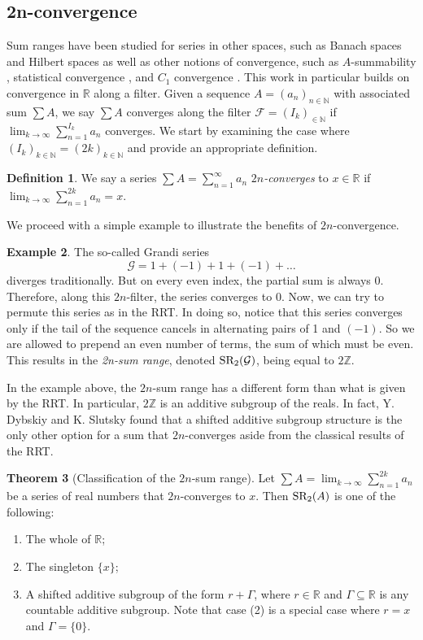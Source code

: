 \documentclass{article}
\theoremstyle{definition}
\newtheorem{theorem}{Theorem}[subsection]
\newtheorem{definition}[theorem]{Definition}
\newtheorem{example}[theorem]{Example}
\newcommand{\R}{\mathbb{R}}
\newcommand{\N}{\mathbb{N}}
\newcommand{\Z}{\mathbb{Z}}
\newcommand{\SR}{\textnormal{SR}}
\begin{document}
\subsection{2n-convergence}
Sum ranges have been studied for series in other spaces, such as Banach spaces\cite{C-G-K,K-K} and Hilbert spaces\cite{Hadwiger} as well as other notions of convergence, such as $A$-summability \cite{L-Z}, statistical convergence \cite{Fast}, and $C_1$ convergence \cite{B-E}. This work in particular builds on convergence in $\R$ along a filter. Given a sequence $A = (a_n)_{n \in \N}$ with associated sum $\sum A$, we say $\sum A$ converges along the filter $\mathcal{F} = (I_k)_{ \in \N}$ if $\lim_{k \to \infty}\sum_{n=1}^{I_k} a_n$ converges. We start by examining the case where $(I_k)_{k \in \N} = (2k)_{k \in \N}$ and provide an appropriate definition.
\begin{definition}
    We say a series $\sum A = \sum_{n=1}^{\infty} a_n$ \emph{$2n$-converges} to $x \in \R$ if $\lim_{k \to \infty}\sum_{n=1}^{2k}a_n = x$.
\end{definition}
We proceed with a simple example to illustrate the benefits of $2n$-convergence.
\begin{example}
    The so-called Grandi series
    \[\mathcal{G} = 1 + (-1) + 1 + (-1) + \dots\]
    diverges traditionally. But on every even index, the partial sum is always 0. Therefore, along this $2n$-filter, the series converges to 0. Now, we can try to permute this series as in the RRT. In doing so, notice that this series converges only if the tail of the sequence cancels in alternating pairs of 1 and $(-1)$. So we are allowed to prepend an even number of terms, the sum of which must be even. This results in the \emph{2n-sum range}, denoted $\SR_2(\mathcal{G})$, being equal to $2\Z$.
\end{example}

In the example above, the $2n$-sum range has a different form than what is given by the RRT. In particular, $2\Z$ is an additive subgroup of the reals. In fact, Y. Dybskiy and K. Slutsky found that a shifted additive subgroup structure is the only other option for a sum that $2n$-converges aside from the classical results of the RRT\cite{D-S}.
\begin{theorem}[Classification of the $2n$-sum range]
    Let $\sum A = \lim_{k \to \infty} \sum_{n=1}^{2k} a_n$ be a series of real numbers that $2n$-converges to $x$. Then $\SR_2(A)$ is one of the following:
    \begin{enumerate}
        \item[(1)] The whole of $\R$;
        \item[(2)] The singleton $\{x\}$;
        \item[(3)] A shifted additive subgroup of the form $r + \Gamma$, where $r \in \R$ and $\Gamma \subseteq \R$ is any countable additive subgroup. Note that case (2) is a special case where $r = x$ and $\Gamma = \{0\}$.
    \end{enumerate}
\end{theorem}
\end{document}
